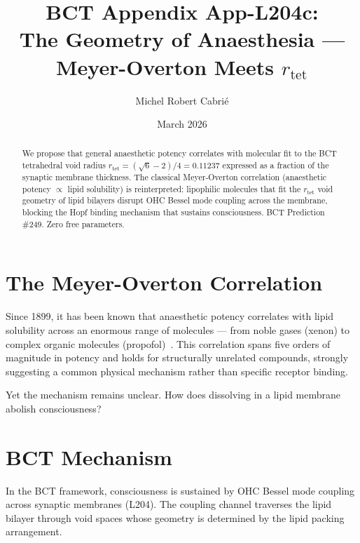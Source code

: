 \documentclass[aps,prl,twocolumn,superscriptaddress]{revtex4-2}
\begin{document}
\title{BCT Appendix App-L204c:\\
The Geometry of Anaesthesia --- Meyer-Overton Meets $r_{\mathrm{tet}}$}
\author{Michel Robert Cabri\'e}
\date{March 2026}

\begin{abstract}
We propose that general anaesthetic potency correlates with molecular fit to the BCT tetrahedral void radius $r_{\mathrm{tet}} = (\sqrt{6}-2)/4 = 0.11237$ expressed as a fraction of the synaptic membrane thickness. The classical Meyer-Overton correlation (anaesthetic potency $\propto$ lipid solubility) is reinterpreted: lipophilic molecules that fit the $r_{\mathrm{tet}}$ void geometry of lipid bilayers disrupt OHC Bessel mode coupling across the membrane, blocking the Hopf binding mechanism that sustains consciousness. BCT Prediction \#249. Zero free parameters.
\end{abstract}

\maketitle

\section{The Meyer-Overton Correlation}

Since 1899, it has been known that anaesthetic potency correlates with lipid solubility across an enormous range of molecules --- from noble gases (xenon) to complex organic molecules (propofol)~\cite{Meyer1899}. This correlation spans five orders of magnitude in potency and holds for structurally unrelated compounds, strongly suggesting a common physical mechanism rather than specific receptor binding.

Yet the mechanism remains unclear. How does dissolving in a lipid membrane abolish consciousness?

\section{BCT Mechanism}

In the BCT framework, consciousness is sustained by OHC Bessel mode coupling across synaptic membranes (L204). The coupling channel traverses the lipid bilayer through void spaces whose geometry is determined by the lipid packing arrangement.
\end{document}
